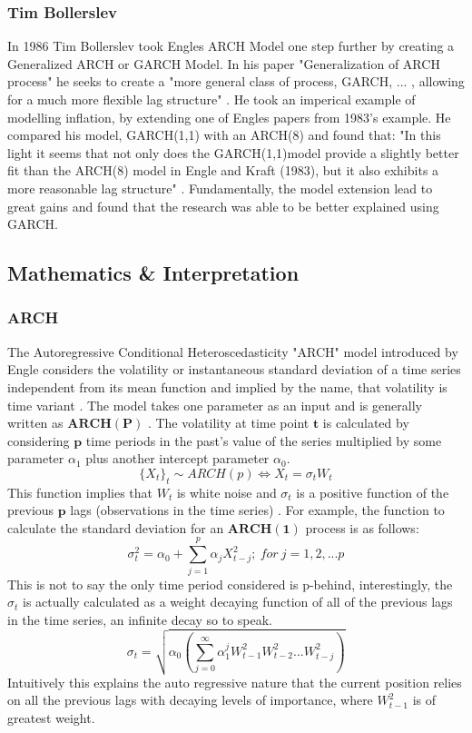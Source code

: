 \subsubsection{Tim Bollerslev}
In 1986 Tim Bollerslev took Engles ARCH Model one step further by creating a Generalized ARCH or GARCH Model. In his paper "Generalization of ARCH process" \cite{BOLLERSLEV1986307} he seeks to create a "more general class of process, GARCH, ... , allowing for a much more flexible lag structure" \cite{BOLLERSLEV1986307}. He took an imperical example of modelling inflation, by extending one of Engles papers from 1983's example. He compared his model, GARCH(1,1) with an ARCH(8) and found that: "In this light it seems that not only does the GARCH(1,1)model provide a slightly better fit than the ARCH(8) model in Engle and Kraft (1983), but it also exhibits a more reasonable lag structure" \cite{BOLLERSLEV1986307}. Fundamentally, the model extension lead to great gains and found that the research was able to be better explained using GARCH. 

\subsection{Mathematics \& Interpretation}
\subsubsection{ARCH}
The Autoregressive Conditional Heteroscedasticity "ARCH" model introduced by Engle considers the volatility or instantaneous standard deviation of a time series independent from its mean function and implied by the name, that volatility is time variant \cite{carmona2004}. The model takes one parameter as an input and is generally written as $\mathbf{ARCH(P)}$ . The volatility at time point $\mathbf{t}$ is calculated by considering $\mathbf{p}$ time periods in the past's value of the series multiplied by some parameter $\alpha_1$ plus another intercept parameter $\alpha_0$.$$\{X_t\}_t \sim ARCH(p) \iff X_t = \sigma_tW_t$$This function implies that $W_t$ is white noise and $\sigma_t$ is a positive function of the previous $\mathbf{p}$ lags (observations in the time series) \cite{carmona2004}. For example, the function to calculate the standard deviation for an $\mathbf{ARCH(1)}$ process is as follows: 
$$\sigma_t^2 = \alpha_0 + \sum^p_{j=1} \alpha_jX^2_{t-j}; ~ for~j = 1,2,...p$$This is not to say the only time period considered is p-behind, interestingly, the $\sigma_t$ is actually calculated as a weight decaying function of all of the previous lags in the time series, an infinite decay so to speak. 
$$ 
\sigma_t = \sqrt{\alpha_0(\sum^\infty_{j=0} \alpha_1^jW^2_{t-1}W^2_{t-2}...W^2_{t-j})}
$$Intuitively this explains the auto regressive nature that the current position relies on all the previous lags with decaying levels of importance, where $W^2_{t-1}$ is of greatest weight.

